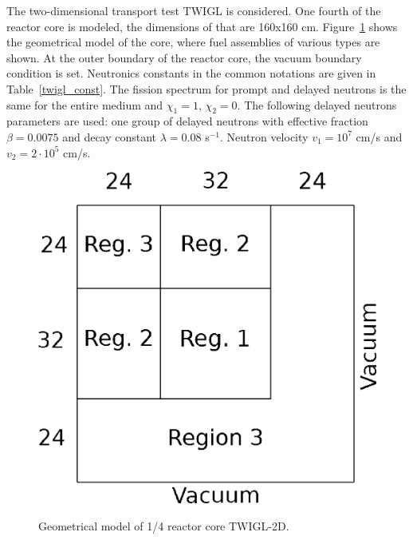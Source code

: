 \documentclass[preprint]{elsarticle}
\begin{document}
The two-dimensional transport test TWIGL is considered.
One fourth of the reactor core is modeled, the dimensions of that are 160x160 cm.
Figure~\ref{twigl} shows the geometrical model of the core, where fuel assemblies of various types are shown.
At the outer boundary of the reactor core, the vacuum boundary condition is set.
Neutronics constants in the common notations are given in Table~\ref{twigl_const}.
The fission spectrum for prompt and delayed neutrons is the same for the entire medium and $\chi_1 = 1$, $\chi_2 = 0$.
The following delayed neutrons parameters are used: one group of delayed neutrons with eﬀective fraction $\beta = 0.0075$ and decay constant $\lambda = 0.08$ s$^{-1}$. 
Neutron velocity $v_1 = 10^7$ cm/s and $v_2 = 2 \cdot 10^5$ cm/s.

\begin{figure}[ht]
\begin{center}
	\includegraphics[width=0.5\linewidth]{twigl/twigl_geo.eps} \\
	\caption{\label{image:canonsummary}Geometrical model of 1/4 reactor core TWIGL-2D.}
	\label{twigl}
\end{center}
\end{figure}
\end{document}
